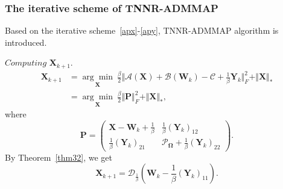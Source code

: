 \documentclass{article}
\begin{document}
{%

\subsubsection{The iterative scheme of TNNR-ADMMAP}
Based on the iterative scheme~\eqref{apx}-\eqref{apy}, TNNR-ADMMAP algorithm is introduced.

$\textit{Computing}$  $\mathbf X_{k+1}$.
\begin{equation}
    \begin{aligned}
            \mathbf X_{k+1} & = \underset{\mathbf X}{\arg\min}\ \frac{\beta}{2}\Vert \mathcal{A}(\mathbf X) + \mathcal{B}(\mathbf W_k) - \mathcal{C} + \frac{1}{\beta}\mathbf Y_{k} \Vert_F^2 + \Vert\mathbf X \Vert_* \\
            & = \underset{\mathbf X}{\arg\min}\ \frac{\beta}{2}\Vert \mathbf P \Vert^2_F + \Vert\mathbf X \Vert_*,
    \end{aligned}
\end{equation}
where 
\begin{equation*}
    \mathbf P = \begin{pmatrix}
        \mathbf X- \mathbf W_k + \frac{1}{\beta} & \frac{1}{\beta} (\mathbf Y_k)_{12} \\
        \frac{1}{\beta}(\mathbf Y_k)_{21} & \mathcal{P}_{\mathbf\Omega} + \frac{1}{\beta}(\mathbf Y_k)_{22}
    \end{pmatrix}.
\end{equation*}
By Theorem~\eqref{thm32}, we get
\begin{equation}
    \mathbf X_{k+1} = \mathcal{D}_{\frac{1}{\beta}}\left(\mathbf W_k - \frac{1}{\beta}(\mathbf Y_k)_{11}\right).
\end{equation}

}
\end{document}
